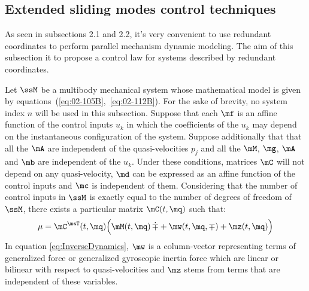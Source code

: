\subsection{Extended sliding modes control techniques}\label{S02-4}

As seen in subsections 2.1 and 2.2, it's very convenient to use redundant coordinates to perform parallel mechanism dynamic modeling. 
The aim of this subsection it to propose a control law for systems described by redundant coordinates.

Let $\ssM$ be a multibody mechanical system whose mathematical model is given 
by equations~(\ref{eq:02-105B},~\ref{eq:02-112B}).
For the sake of brevity, no system index $n$ will be used in this subsection.
Suppose that each $\mf$ is an affine function of the control inputs $u_{k}$
in which the coefficients of the $u_{k}$ may depend on the instantaneous
configuration of the system.
Suppose additionally that that all the $\mA$ are independent
of the quasi-velocities $p_{j}$ and all the $\mM$, $\mg$, $\mA$ and $\mb$ 
are independent of the $u_{k}$.
Under these conditions, matrices $\mC$ will not depend on 
any quasi-velocity, $\md$ can be expressed as an affine function of the control inputs 
and $\mc$ is independent of them.
Considering that the number of control inputs in $\ssM$ is
exactly equal to the number of degrees of freedom of $\ssM$, 
there exists a particular matrix $\mC(t,\mq)$ such that:
\begin{equation} \label{eq:InverseDynamics}
\mu = \mC^\msT(t,\mq) \Big( \mM (t, \mq) \, \dot{\mp} + \mw(t,\mq,\mp) + \mz(t,\mq) \Big)
\end{equation}
In equation \eqref{eq:InverseDynamics}, $\mw$ is a column-vector representing terms of generalized force 
or generalized gyroscopic inertia force which are linear or bilinear with respect to quasi-velocities 
and $\mz$ stems from terms that are independent of these variables.

